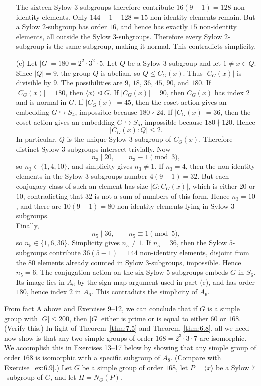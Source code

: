 \documentclass[../Odyssey_Project.tex]{subfiles}
\begin{document}
\begin{solution}
\begin{enumerate}
        The sixteen Sylow $3$-subgroups therefore contribute $16(9-1)=128$ non-identity elements. Only $144-1-128=15$ non-identity elements remain. But a Sylow $2$-subgroup has order $16$, and hence has exactly $15$ non-identity elements, all outside the Sylow $3$-subgroups. Therefore every Sylow $2$-subgroup is the same subgroup, making it normal. This contradicts simplicity.
        \item[(e)] Let $|G|=180=2^2\cdot 3^2\cdot 5$. Let $Q$ be a Sylow $3$-subgroup and let $1\neq x\in Q$. Since $|Q|=9$, the group $Q$ is abelian, so $Q\leq C_G(x)$. Thus $|C_G(x)|$ is divisible by $9$. The possibilities are $9$, $18$, $36$, $45$, $90$, and $180$. If $|C_G(x)|=180$, then $\langle x\rangle\trianglelefteq G$. If $|C_G(x)|=90$, then $C_G(x)$ has index $2$ and is normal in $G$. If $|C_G(x)|=45$, then the coset action gives an embedding $G\hookrightarrow S_4$, impossible because $180\nmid 24$. If $|C_G(x)|=36$, then the coset action gives an embedding $G\hookrightarrow S_5$, impossible because $180\nmid 120$. Hence
        \[
            |C_G(x):Q|\leq 2.
        \]
        In particular, $Q$ is the unique Sylow $3$-subgroup of $C_G(x)$. Therefore distinct Sylow $3$-subgroups intersect trivially. Now
        \[
            n_3\mid 20,\qquad n_3\equiv 1\pmod 3,
        \]
        so $n_3\in\{1,4,10\}$, and simplicity gives $n_3\neq 1$. If $n_3=4$, then the non-identity elements in the Sylow $3$-subgroups number $4(9-1)=32$. But each conjugacy class of such an element has size $|G:C_G(x)|$, which is either $20$ or $10$, contradicting that $32$ is not a sum of numbers of this form. Hence $n_3=10$, and there are $10(9-1)=80$ non-identity elements lying in Sylow $3$-subgroups.\\
        Finally,
        \[
            n_5\mid 36,\qquad n_5\equiv 1\pmod 5,
        \]
        so $n_5\in\{1,6,36\}$. Simplicity gives $n_5\neq 1$. If $n_5=36$, then the Sylow $5$-subgroups contribute $36(5-1)=144$ non-identity elements, disjoint from the $80$ elements already counted in Sylow $3$-subgroups, impossible. Hence $n_5=6$. The conjugation action on the six Sylow $5$-subgroups embeds $G$ in $S_6$. Its image lies in $A_6$ by the sign-map argument used in part (c), and has order $180$, hence index $2$ in $A_6$. This contradicts the simplicity of $A_6$.
    \end{enumerate}
\end{solution}

\noindent From fact A above and Exercises 9--12, we can conclude that if $G$ is a simple group with $|G| \leq 200$, then $|G|$ either is prime or is equal to either $60$ or $168$. (Verify this.) In light of Theorem~\ref{thm:7.5} and Theorem~\ref{thm:6.8}, all we need now show is that any two simple groups of order $168 = 2^3 \cdot 3 \cdot 7$ are isomorphic. We accomplish this in Exercises 13--17 below by showing that any simple group of order $168$ is isomorphic with a specific subgroup of $A_8$. (Compare with Exercise~\ref{ex:6.9}.) Let $G$ be a simple group of order $168$, let $P = \langle x \rangle$ be a Sylow $7$-subgroup of $G$, and let $H = N_G(P)$.
\end{document}
